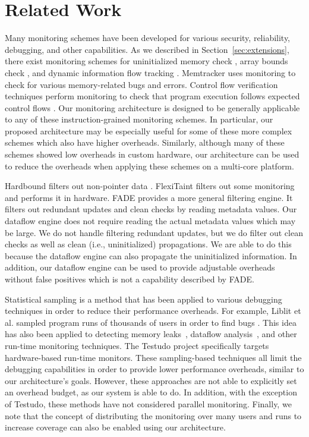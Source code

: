 \section{Related Work}
\label{sec:related}

Many monitoring schemes have been developed for various security, reliability,
debugging, and other capabilities.  As we described in
Section~\ref{sec:extensions}, there exist monitoring schemes for uninitialized
memory check \cite{mondrian-asplos02}, array bounds check
\cite{hardbound-asplos08, clause-ase07}, and dynamic information flow
tracking \cite{dift-asplos04, raksha-isca07, loki-osdi08}.
Memtracker \cite{memtracker-hpca07} uses monitoring to check for various
memory-related bugs and errors.  Control flow verification techniques perform
monitoring to check that program execution follows expected control flows
\cite{schuette-comp87, impres-dac06,
kayaalp-isca12}.  Our monitoring architecture is designed to
be generally applicable to any of these instruction-grained monitoring schemes.
In particular, our proposed architecture may be especially useful for some of
these more complex schemes which also have higher overheads.  Similarly,
although many of these schemes showed low overheads in custom hardware, our
architecture can be used to reduce the overheads when applying these schemes on
a multi-core platform.
 
Hardbound filters out non-pointer data \cite{hardbound-asplos08}. FlexiTaint filters out some monitoring
and performs it in hardware. FADE \cite{fade-hpca14} provides a more general filtering engine. It
filters out redundant updates and clean checks by reading metadata values. Our
dataflow engine does not require reading the actual metadata values which may
be large. We do not handle filtering redundant updates, but we do filter out
clean checks as well as clean (i.e., uninitialized) propagations. We are able
to do this because the dataflow engine can also propagate the uninitialized
information. In addition, our dataflow engine can be used to provide adjustable
overheads without false positives which is not a capability described by FADE.

Statistical sampling is a method that has been applied to various debugging
techniques in order to reduce their performance overheads. For example, Liblit
et al. sampled program runs of thousands of users in order to find bugs
\cite{liblit-pldi05}. This idea has also been applied to detecting memory
leaks~\cite{chilimbi-asplos04}, dataflow analysis~\cite{greathouse-cgo11}, and
other run-time monitoring techniques. The Testudo project
\cite{testudo-micro08} specifically targets hardware-based run-time monitors.
These sampling-based techniques all limit the debugging capabilities in order
to provide lower performance overheads, similar to our architecture's goals.
However, these approaches are not able to explicitly set an overhead budget, as
our system is able to do. In addition, with the exception of Testudo, these
methods have not considered parallel monitoring. Finally, we note that the
concept of distributing the monitoring over many users and runs to increase
coverage can also be enabled using our architecture.

